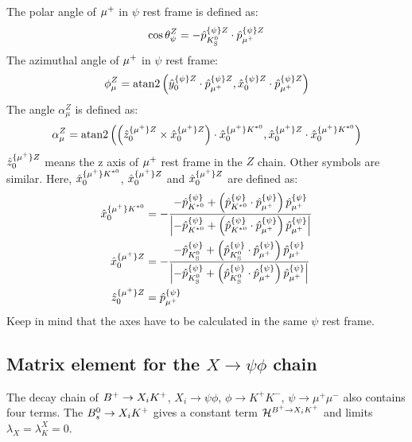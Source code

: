 The polar angle of ${\mu^+}$ in $\psi$ rest frame is defined as:
\begin{equation}
\cos \theta_{\psi}^{Z} = -{\hat{p}}_{{{K}^0_{\mathrm{S}}}}^{\{\psi\}Z} \cdot {\hat{p}}_{{\mu^+}}^{\{\psi\}Z}
\end{equation}
The azimuthal angle of ${\mu^+}$ in $\psi$ rest frame:
\begin{equation}
\phi_{\mu}^{Z} = \mathrm{atan2}  \left(  {\hat{y}}_{0}^{\{\psi\}Z} \cdot {\hat{p}}_{{\mu^+}}^{\{\psi\}Z}, {\hat{x}}_{0}^{\{\psi\}Z} \cdot {\hat{p}}_{{\mu^+}}^{\{\psi\}Z} \right)
\end{equation}
The angle $\alpha_\mu^{Z}$ is defined as:
\begin{equation}
\alpha_\mu^{Z} = \mathrm{atan2}\left( \left(  \hat{z}_0^{\{{\mu^+}\}Z}  \times  \hat{x}_0^{\{{\mu^+}\}Z}  \right) \cdot \hat{x}_0^{\{{\mu^+}\}{{K}^{*0}}}, \hat{x}_0^{\{{\mu^+}\}Z}  \cdot \hat{x}_0^{\{{\mu^+}\}{{K}^{*0}}} \right)
\end{equation}
$\hat{z}_0^{\{{\mu^+}\}Z}$ means the z axis of ${\mu^+}$ rest frame in the $Z$ chain. Other symbols are similar. 
Here, $\hat{x}_0^{\{{\mu^+}\}{{K}^{*0}}}$, $\hat{x}_0^{\{{\mu^+}\}Z}$ and $\hat{x}_0^{\{{\mu^+}\}Z}$ are defined as:
\begin{align}
\label{Eq:app_axis_murest_in_kstar_chain}
\hat{x}_0^{\{\mup\}\Kstarz} & = 
- \frac{ -\hat{p}_{\Kstarz}^{\{\psi\}} + \left( \hat{p}_{\Kstarz}^{\{\psi\}} \cdot 
\hat{p}_{\mup}^{\{\psi\}} \right) 
\hat{p}_{\mup}^{\{\psi\}} }
{\left| -\hat{p}_{\Kstarz}^{\{\psi\}} + \left( \hat{p}_{\Kstarz}^{\{\psi\}} \cdot 
\hat{p}_{\mup}^{\{\psi\}} \right) 
\hat{p}_{\mup}^{\{\psi\}}  \right|}  \\%
\hat{x}_0^{\{\mup\}Z} & = 
- \frac{ -\hat{p}_{\KS}^{\{\psi\}} + \left( \hat{p}_{\KS}^{\{\psi\}} \cdot 
\hat{p}_{\mup}^{\{\psi\}} \right) 
\hat{p}_{\mup}^{\{\psi\}} }
{\left| -\hat{p}_{\KS}^{\{\psi\}} + \left( \hat{p}_{\KS}^{\{\psi\}} \cdot 
\hat{p}_{\mup}^{\{\psi\}} \right) 
\hat{p}_{\mup}^{\{\psi\}}  \right|} \\ %
\hat{z}_0^{\{\mup\}Z} & = \hat{p}_{\mup}^{\{\psi\}}
\end{align}
Keep in mind that the axes have to be calculated in the same $\psi$ rest frame.



\subsection{Matrix element for the $X \to \psi \phi$ chain}
The decay chain of ${{{B}^+}}\rightarrow X_i {{K}^+}$, $X_i\to \psi \phi$, $\phi\to K^+K^-$,  $\psi\to \mu^+\mu^-$ also contains four terms. 
The ${{B}^0_{s}}\rightarrow X_i {{K}^+}$ gives a constant term ${\cal H}^{{{{B}^+}}\rightarrow X_i {{K}^+}}$ and limits $\lambda_{X}=\lambda_{K}^X=0$. 

